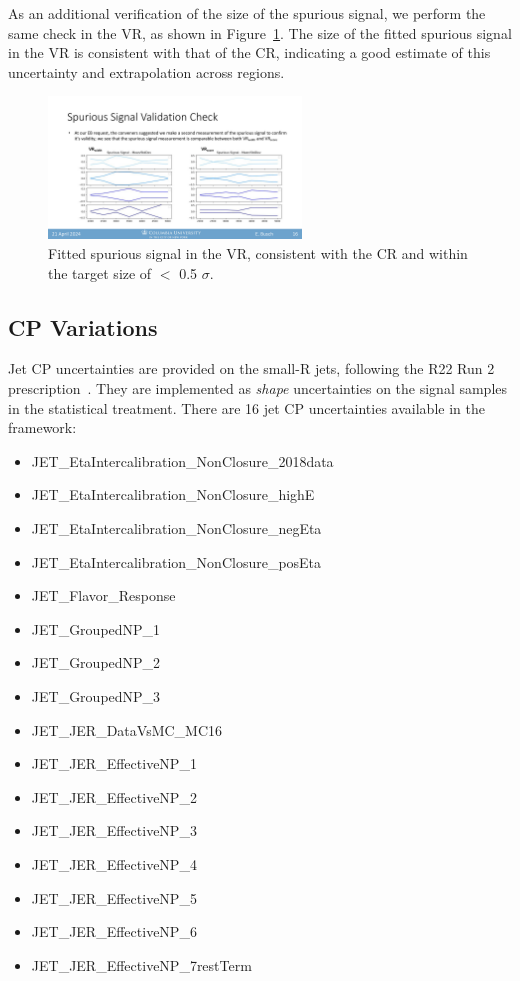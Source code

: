 As an additional verification of the size of the spurious signal, we perform the same check in the VR, as shown in Figure~\ref{fig:spursig_vs_mass_vr}.
The size of the fitted spurious signal in the VR is consistent with that of the CR, indicating a good estimate of this uncertainty and extrapolation across regions.
\begin{figure}[!htbp]
\centering
   \includegraphics[width=0.6\textwidth]{figures/systs/spursig_vs_mass_vr}
    \caption{Fitted spurious signal in the VR, consistent with the CR and within the target size of $<$ 0.5 $\sigma$.
    \label{fig:spursig_vs_mass_vr}}
\end{figure}



\subsection{CP Variations}

Jet CP uncertainties are provided on the small-R jets, following the R22 Run 2 prescription~\cite{PERF-2014-07, PERF-2015-09, JETM-2018-05}.
They are implemented as \textit{shape} uncertainties on the signal samples in the statistical treatment.
There are 16 jet CP uncertainties available in the framework:

\begin{itemize}
  \item JET\_EtaIntercalibration\_NonClosure\_2018data
  \item JET\_EtaIntercalibration\_NonClosure\_highE
  \item JET\_EtaIntercalibration\_NonClosure\_negEta
  \item JET\_EtaIntercalibration\_NonClosure\_posEta
  \item JET\_Flavor\_Response
  \item JET\_GroupedNP\_1
  \item JET\_GroupedNP\_2
  \item JET\_GroupedNP\_3
  \item JET\_JER\_DataVsMC\_MC16
  \item JET\_JER\_EffectiveNP\_1
  \item JET\_JER\_EffectiveNP\_2
  \item JET\_JER\_EffectiveNP\_3
  \item JET\_JER\_EffectiveNP\_4
  \item JET\_JER\_EffectiveNP\_5
  \item JET\_JER\_EffectiveNP\_6
  \item JET\_JER\_EffectiveNP\_7restTerm
\end{itemize}

